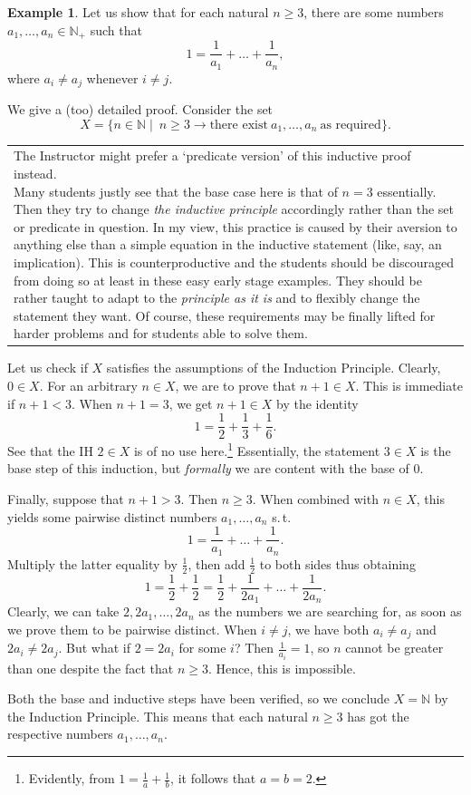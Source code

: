 \documentclass[12pt,notitlepage]{article}
\theoremstyle{plain}
\theoremstyle{definition}
\newtheorem{exm}[thm]{Example}
\theoremstyle{plain}
\newcommand{\N}{\mathbb{N}}
\newcommand{\1}{\mathbf{1}}
\newcommand{\0}{\mathbf{0}}
\newcommand{\mcomm}[1]{
\medskip\noindent\begin{tabular}{| l}
\parbox{0.99\textwidth}{{\small
#1 }}\end{tabular}
\smallskip}
\begin{document}
\begin{exm}
Let us show that for each natural $n \geq 3$, there are some numbers $a_1,\ldots,a_n \in \N_+$ such that
$$1 = \frac{1}{a_1} + \ldots + \frac{1}{a_n},$$
where $a_i \neq a_j$ whenever $i \neq j$.

We give a (too) detailed proof. Consider the set
$$X = \{ n \in \N \mid\  n \geq 3 \to \mbox{there exist}\ a_1,\ldots, a_n\ \mbox{as required}\}.$$
\mcomm{The Instructor might prefer a `predicate version' of this inductive proof instead.
\medskip\\
Many students justly see that the base case here is that of $n = 3$ essentially. Then they try to change \emph{the inductive principle} accordingly rather than the set or predicate in question. In my view, this practice is caused by their aversion to anything else than a simple equation in the inductive statement (like, say, an implication). This is counterproductive and the students should be discouraged from doing so at least in these easy early stage examples. They should be rather taught to adapt to the \emph{principle as it is} and to flexibly change the statement they want. Of course, these requirements may be finally lifted for harder problems and for students able to solve them.}
Let us check if $X$ satisfies the assumptions of the Induction Principle. Clearly, $0 \in X$. For an arbitrary $n \in X$, we are to prove that $n + 1 \in X$. This is immediate if $n + 1 < 3$. When $n + 1 = 3$, we get $n+1 \in X$ by the identity
$$1 = \frac{1}{2} + \frac{1}{3} + \frac{1}{6}.$$
See that the IH $2 \in X$ is of no use here.\footnote{Evidently, from $1 = \frac{1}{a} + \frac{1}{b}$, it follows that $a = b = 2$.} Essentially, the statement $3 \in X$ is the base step of this induction, but \emph{formally} we are content with the base of $0$.

Finally, suppose that $n + 1 > 3$. Then $n \geq 3$. When combined with $n \in X$, this yields some pairwise distinct numbers $a_1,\ldots, a_n$ s.\,t.\ 
$$1 = \frac{1}{a_1} + \ldots + \frac{1}{a_n}.$$
Multiply the latter equality by $\frac{1}{2}$, then add $\frac{1}{2}$ to both sides thus obtaining
$$1 = \frac{1}{2} + \frac{1}{2} = \frac{1}{2} + \frac{1}{2a_1} + \ldots + \frac{1}{2a_n}.$$
Clearly, we can take $2, 2a_1, \ldots, 2a_n$ as the numbers we are searching for, as soon as we prove them to be pairwise distinct. When $i \neq j$, we have both $a_i \neq a_j$ and $2a_i \neq 2a_j$. But what if $2 = 2 a_i$ for some $i$? Then $\frac{1}{a_i} = 1$, so $n$ cannot be greater than one despite the fact that $n \geq 3$. Hence, this is impossible.

Both the base and inductive steps have been verified, so we conclude $X = \N$ by the Induction Principle. This means that each natural $n \geq 3$ has got the respective numbers $a_1,\ldots, a_n$.
\end{exm}
\end{document}
